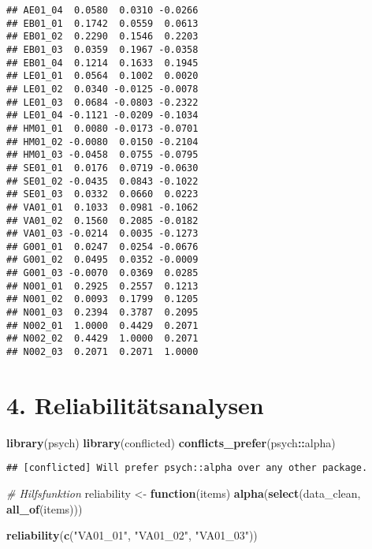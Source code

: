 \documentclass[
]{article}
\newenvironment{Shaded}{\begin{snugshade}}{\end{snugshade}}
\newcommand{\CommentTok}[1]{\textcolor[rgb]{0.56,0.35,0.01}{\textit{#1}}}
\newcommand{\ControlFlowTok}[1]{\textcolor[rgb]{0.13,0.29,0.53}{\textbf{#1}}}
\newcommand{\FunctionTok}[1]{\textcolor[rgb]{0.13,0.29,0.53}{\textbf{#1}}}
\newcommand{\NormalTok}[1]{#1}
\newcommand{\OtherTok}[1]{\textcolor[rgb]{0.56,0.35,0.01}{#1}}
\newcommand{\SpecialCharTok}[1]{\textcolor[rgb]{0.81,0.36,0.00}{\textbf{#1}}}
\newcommand{\StringTok}[1]{\textcolor[rgb]{0.31,0.60,0.02}{#1}}
\begin{document}
\begin{verbatim}
## AE01_04  0.0580  0.0310 -0.0266
## EB01_01  0.1742  0.0559  0.0613
## EB01_02  0.2290  0.1546  0.2203
## EB01_03  0.0359  0.1967 -0.0358
## EB01_04  0.1214  0.1633  0.1945
## LE01_01  0.0564  0.1002  0.0020
## LE01_02  0.0340 -0.0125 -0.0078
## LE01_03  0.0684 -0.0803 -0.2322
## LE01_04 -0.1121 -0.0209 -0.1034
## HM01_01  0.0080 -0.0173 -0.0701
## HM01_02 -0.0080  0.0150 -0.2104
## HM01_03 -0.0458  0.0755 -0.0795
## SE01_01  0.0176  0.0719 -0.0630
## SE01_02 -0.0435  0.0843 -0.1022
## SE01_03  0.0332  0.0660  0.0223
## VA01_01  0.1033  0.0981 -0.1062
## VA01_02  0.1560  0.2085 -0.0182
## VA01_03 -0.0214  0.0035 -0.1273
## G001_01  0.0247  0.0254 -0.0676
## G001_02  0.0495  0.0352 -0.0009
## G001_03 -0.0070  0.0369  0.0285
## N001_01  0.2925  0.2557  0.1213
## N001_02  0.0093  0.1799  0.1205
## N001_03  0.2394  0.3787  0.2095
## N002_01  1.0000  0.4429  0.2071
## N002_02  0.4429  1.0000  0.2071
## N002_03  0.2071  0.2071  1.0000
\end{verbatim}

\section{4. Reliabilitätsanalysen}\label{reliabilituxe4tsanalysen}

\begin{Shaded}
\begin{Highlighting}[]
\FunctionTok{library}\NormalTok{(psych)}
\FunctionTok{library}\NormalTok{(conflicted)}
\FunctionTok{conflicts\_prefer}\NormalTok{(psych}\SpecialCharTok{::}\NormalTok{alpha)}
\end{Highlighting}
\end{Shaded}

\begin{verbatim}
## [conflicted] Will prefer psych::alpha over any other package.
\end{verbatim}

\begin{Shaded}
\begin{Highlighting}[]
\CommentTok{\# Hilfsfunktion}
\NormalTok{reliability }\OtherTok{\textless{}{-}} \ControlFlowTok{function}\NormalTok{(items) }\FunctionTok{alpha}\NormalTok{(}\FunctionTok{select}\NormalTok{(data\_clean, }\FunctionTok{all\_of}\NormalTok{(items)))}

\FunctionTok{reliability}\NormalTok{(}\FunctionTok{c}\NormalTok{(}\StringTok{"VA01\_01"}\NormalTok{, }\StringTok{"VA01\_02"}\NormalTok{, }\StringTok{"VA01\_03"}\NormalTok{))}
\end{Highlighting}
\end{Shaded}
\end{document}
